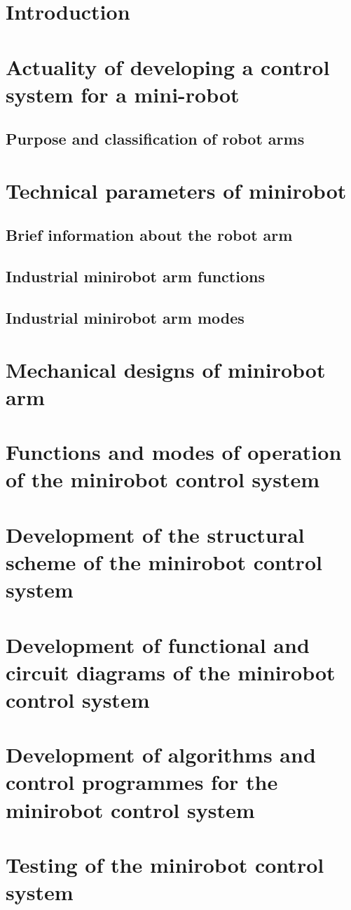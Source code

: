 
\section*{Introduction}


\section{ Actuality of developing a control system for a mini-robot}



\subsection{Purpose and classification of robot arms} 






\section{Technical parameters of minirobot}
\subsection{Brief information about the robot arm} 


\subsection{Industrial minirobot arm functions}  
\subsection{Industrial minirobot arm modes}


\section{Mechanical designs of minirobot arm}

\section{Functions and modes of operation of the minirobot control system }

\section{Development of the structural scheme of the minirobot control system}

\section{Development of functional and circuit diagrams of the minirobot control system}


\section{Development of algorithms and control programmes for the minirobot control system}


\section{Testing of the minirobot control system }

% 
